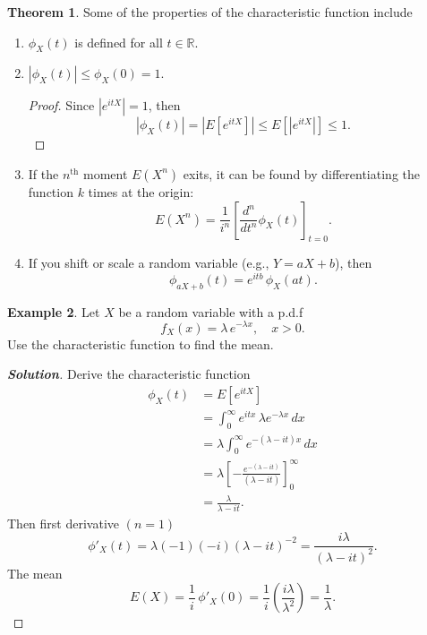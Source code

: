 \documentclass[12pt,a4paper]{report}
\theoremstyle{definition}
\newtheorem{thm}{Theorem}[section]
\newtheorem{example}[thm]{Example}
\theoremstyle{plain}
\theoremstyle{definition}
\begin{document}
\begin{thm}
Some of the properties of the characteristic function include
\begin{enumerate}
\item $\phi_X(t)$ is defined for all $t\in \mathbb{R}.$
\item $\left|\phi_X(t)\right| \leq \phi_X(0) = 1.$
\begin{proof}
Since $\left|e^{itX}\right| = 1$, then 
\[\left|\phi_X(t)\right|   = \left|E\left[e^{itX}\right]\right|  \leq E\left[\left|e^{itX}\right|\right] \leq 1.\]
\end{proof}
\item If the $n^{\text{th}}$ moment $E(X^n)$ exits, it can be found by differentiating the function $k$ times at the origin: \[E(X^n) = \frac{1}{i^n}\left[\frac{d^n}{dt^n}\phi_X(t)\right]_{t = 0}.\]
\item If you shift or scale a random variable (e.g., $Y = aX + b$), then \[\phi_{aX + b}(t) = e^{itb}\, \phi_X(at).\]
\end{enumerate}
\end{thm}



\begin{example}
Let $X$ be a random variable with a p.d.f \[f_X(x) = \lambda\, e^{-\lambda x}, \quad x > 0.\] Use the characteristic function to find the mean.
\end{example}

\begin{proof}[\textbf{\textit{Solution}}]
Derive the characteristic function
\begin{align*}
\phi_X(t) & = E\left[e^{itX}\right]\\
& = \int_0^{\infty}e^{itx}\, \lambda e^{-\lambda x}\, dx\\
& = \lambda \int^{\infty}_0 e^{-(\lambda - it)x}\, dx\\
& = \lambda \left[-\frac{e^{-(\lambda - it)}}{(\lambda - it)}\right]^{\infty}_0\\
& = \frac{\lambda}{\lambda - it}.
\end{align*}
Then first derivative $(n = 1)$
\[\phi'_X(t) = \lambda (-1)(-i)(\lambda - it)^{-2} = \frac{i\lambda}{(\lambda - it)^2}.\]
The mean
\[E(X)  = \frac{1}{i}\, \phi'_X(0) = \frac{1}{i}\left(\frac{i\lambda}{\lambda^2}\right) = \frac{1}{\lambda}.\]
\end{proof}
\end{document}
